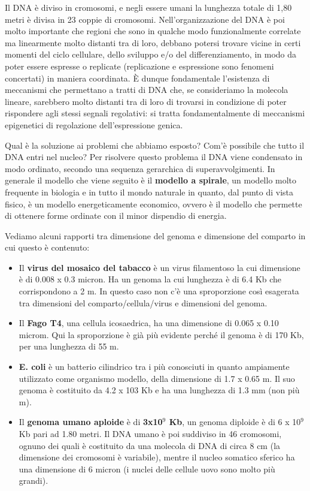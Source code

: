 \documentclass[11pt]{book}
\begin{document}
Il DNA è diviso in cromosomi, e negli essere umani la lunghezza totale di 1,80 metri è divisa in 23 coppie di cromosomi. Nell'organizzazione del DNA è poi molto importante che regioni che sono in qualche modo funzionalmente correlate ma linearmente molto distanti tra di loro, debbano potersi trovare vicine in certi momenti del ciclo cellulare, dello sviluppo e/o del differenziamento, in modo da poter essere espresse o replicate (replicazione e espressione sono fenomeni concertati) in maniera coordinata. È dunque fondamentale l'esistenza di meccanismi che permettano a tratti di DNA che, se consideriamo la molecola lineare, sarebbero molto distanti tra di loro di trovarsi in condizione di poter rispondere agli stessi segnali regolativi: si tratta fondamentalmente di meccanismi epigenetici di regolazione dell’espressione genica.

Qual è la soluzione ai problemi che abbiamo esposto? Com'è possibile che tutto il DNA entri nel nucleo?
Per risolvere questo problema il DNA viene condensato in modo ordinato, secondo una sequenza gerarchica di superavvolgimenti.
In generale il modello che viene seguito è il \textbf{modello a spirale}, un modello molto frequente in biologia e in tutto il mondo naturale in quanto, dal punto di vista fisico, è un modello energeticamente economico, ovvero è il modello che permette di ottenere forme ordinate con il minor dispendio di energia.


Vediamo alcuni rapporti tra dimensione del genoma e dimensione del comparto in cui questo è contenuto:
\begin{itemize}
\item Il \textbf{virus del mosaico del tabacco} è un virus filamentoso la cui dimensione è di 0.008 x 0.3  micron. Ha un genoma la cui lunghezza è di 6.4 Kb che corrispondono a 2 m. In questo caso non c’è una sproporzione così esagerata tra dimensioni del comparto/cellula/virus e dimensioni del genoma.
\item Il \textbf{Fago T4}, una cellula icosaedrica, ha una dimensione di 0.065 x 0.10 microm. Qui la sproporzione è già più evidente perché il genoma è di 170 Kb, per una lunghezza di 55 m.
\item \textbf{E. coli} è un batterio cilindrico tra i più conosciuti in quanto ampiamente utilizzato come organismo modello, della dimensione di 1.7 x 0.65 m. Il suo genoma è costituito da 4.2 x 103 Kb e ha una lunghezza di 1.3 mm (non più m).
\item Il \textbf{genoma umano aploide} è di \textbf{3x10\(^9\) Kb}, un genoma diploide è di 6 x 10\(^9\) Kb pari ad 1.80 metri. Il DNA umano è poi suddiviso in 46 cromosomi, ognuno dei quali è costituito da una molecola di DNA di circa 8 cm (la dimensione dei cromosomi è variabile), mentre il nucleo somatico sferico ha una dimensione di 6 micron (i nuclei delle cellule uovo sono molto più grandi).
\end{itemize}
\end{document}
